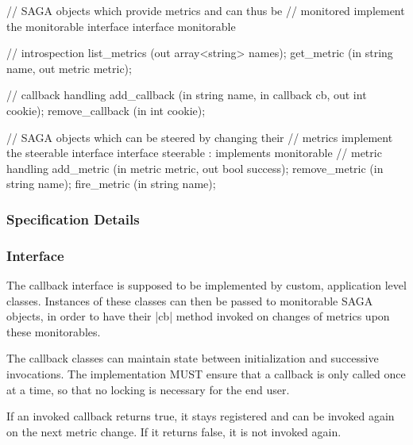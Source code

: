 \begin{myspec}
{ 
    // SAGA objects which provide metrics and can thus be
    // monitored implement the monitorable interface
    interface monitorable
    {
      // introspection
      list_metrics       (out array<string>   names);
      get_metric         (in  string          name,
                          out metric          metric);
 
      // callback handling
      add_callback       (in  string          name,
                          in  callback        cb,
                          out int             cookie);
      remove_callback    (in  int             cookie);
    }
 
 
    // SAGA objects which can be steered by changing their
    // metrics implement the steerable interface
    interface steerable : implements monitorable
    {
      // metric handling
      add_metric         (in  metric          metric,
                          out bool            success);
      remove_metric      (in  string          name);
      fire_metric        (in  string          name);
    }
  }
 \end{myspec}
 
 
 \subsubsection{Specification Details}
 
  \upp
  \subsubsection*{Interface }
 
    \upp
    The callback interface is supposed to be implemented by
    custom, application level classes.  Instances of these
    classes can then be passed to monitorable SAGA
    objects, in order to have their |cb| method invoked on changes
    of metrics upon these monitorables.
 
    The callback classes can maintain state between
    initialization and successive invocations.  The
    implementation MUST ensure that a callback is only called
    once at a time, so that no locking is necessary for the end
    user.

 
    If an invoked callback returns true, it stays registered and
    can be invoked again on the next metric change.  If it
    returns false, it is not invoked again.
 
